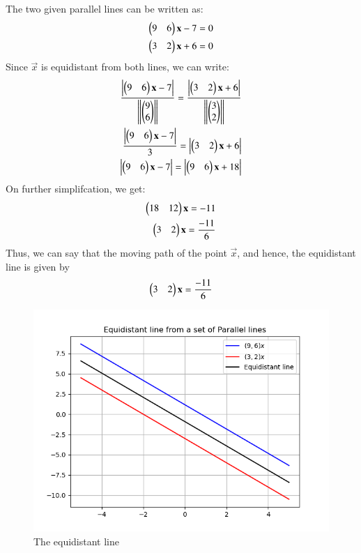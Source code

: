 \documentclass[journal,12pt,twocolumn]{IEEEtran}
\begin{document}
The two given parallel lines can be written as:
\begin{align}
    \begin{pmatrix}9 & 6\end{pmatrix}\mathbf{x} - 7 = 0\\
    \begin{pmatrix}3 & 2\end{pmatrix}\mathbf{x} + 6 = 0
\end{align}
Since $\vec{x}$ is equidistant from both lines, we can write:
\begin{align}
    \frac{\left\vert\begin{pmatrix}9 & 6\end{pmatrix}\mathbf{x} - 7\right\vert}{\left\lVert\begin{pmatrix}9\\6\end{pmatrix}\right\rVert} = \frac{\left\vert\begin{pmatrix}3 & 2\end{pmatrix}\mathbf{x} + 6\right\vert}{\left\lVert\begin{pmatrix}3\\2\end{pmatrix}\right\rVert}\\
    \frac{\left\vert\begin{pmatrix}9 & 6\end{pmatrix}\mathbf{x} - 7\right\vert}{3} = \left\vert\begin{pmatrix}3 & 2\end{pmatrix}\mathbf{x} + 6\right\vert\\
   \left\vert\begin{pmatrix}9 & 6\end{pmatrix}\mathbf{x} - 7\right\vert = \left\vert\begin{pmatrix}9 & 6\end{pmatrix}\mathbf{x} + 18\right\vert
\end{align}
On further simplifcation, we get:
\begin{align}
      \begin{pmatrix}18 & 12\end{pmatrix}\mathbf{x} = -11\\
   \begin{pmatrix}3 & 2\end{pmatrix}\mathbf{x} = \frac{-11}{6}
\end{align}
Thus, we can say that the moving path of the point $\vec{x}$, and hence, the equidistant line is given by 
\begin{align}
    \begin{pmatrix}3 & 2\end{pmatrix}\mathbf{x} = \frac{-11}{6}
\end{align}

\begin{figure}[!ht]
\centering
 \includegraphics[width=\columnwidth]{graph.png}
 \caption{The equidistant line}
 \end{figure}
\end{document}
